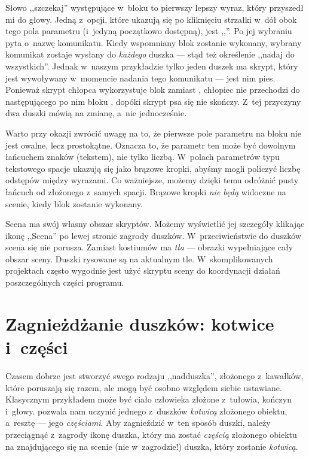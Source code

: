 \documentclass[a4paper]{report}
\begin{document}
Słowo ,,szczekaj'' występujące w~bloku  to pierwszy lepszy wyraz, który przyszedł mi do głowy. Jedną z~opcji, które ukazują się po kliknięciu strzałki w~dół obok tego pola parametru (i~jedyną początkowo dostępną), jest ,,''. Po jej wybraniu \Snap{} pyta o~nazwę komunikatu. Kiedy wspomniany blok zostanie wykonany, wybrany komunikat zostaje wysłany do \emph{każdego} duszka --- stąd też określenie ,,nadaj do wszystkich''. Jednak w~naszym przykładzie tylko jeden duszek ma skrypt, który jest wywoływany w~momencie nadania tego komunikatu --- jest nim pies. Ponieważ skrypt chłopca wykorzystuje blok  zamiast , chłopiec nie przechodzi do następującego po nim bloku , dopóki skrypt psa się nie skończy. Z~tej przyczyny dwa duszki mówią na zmianę, a~nie jednocześnie.

Warto przy okazji zwrócić uwagę na to, że pierwsze pole parametru na bloku  nie jest owalne, lecz prostokątne. Oznacza to, że parametr ten może być dowolnym łańcuchem znaków (tekstem), nie tylko liczbą. W~polach parametrów typu tekstowego spacje ukazują się jako brązowe kropki, abyśmy mogli policzyć liczbę odstępów między wyrazami. Co ważniejsze, możemy dzięki temu odróżnić pusty łańcuch od złożonego z~samych spacji. Brązowe kropki \emph{nie będą} widoczne na scenie, kiedy blok zostanie wykonany.

Scena ma swój własny obszar skryptów. Możemy wyświetlić jej szczegóły klikając ikonę ,,Scena'' po lewej stronie zagrody duszków. W~przeciwieństwie do duszków scena się nie porusza. Zamiast kostiumów ma \emph{tła} --- obrazki wypełniające cały obszar sceny. Duszki rysowane są na aktualnym tle. W~skomplikowanych projektach często wygodnie jest użyć skryptu sceny do koordynacji działań poszczególnych części programu.

\section{Zagnieżdżanie duszków: kotwice i~części}
\label{sec:zagnieżdżanie-duszków}

Czasem dobrze jest stworzyć swego rodzaju ,,nadduszka'', złożonego z~kawałków, które poruszają się razem, ale mogą być osobno względem siebie ustawiane. Klasycznym przykładem może być ciało człowieka złożone z~tułowia, kończyn i~głowy. \Snap{} pozwala nam uczynić jednego z~duszków \emph{kotwicą} złożonego obiektu, a~resztę --- jego \emph{częściami}. Aby zagnieździć w~ten sposób duszki, należy przeciągnąć z~zagrody ikonę duszka, który ma zostać \emph{częścią} złożonego obiektu na znajdującego się na scenie (nie w~zagrodzie!) duszka, który zostanie \emph{kotwicą}.
\end{document}
